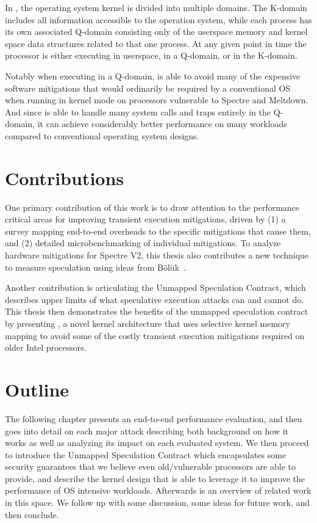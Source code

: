 In \sys, the operating system kernel is divided into multiple domains.
The K-domain includes all information accessible to the operation system, while each process has its own associated Q-domain consisting only of the userspace memory and kernel space data structures related to that one process.
At any given point in time the processor is either executing in userspace, in a Q-domain, or in the K-domain. 

Notably when executing in a Q-domain, \sys is able to avoid many of the expensive software mitigations that would ordinarily be required by a conventional OS when running in kernel mode on processors vulnerable to Spectre and Meltdown.
And since \sys is able to handle many system calls and traps entirely in the Q-domain, it can achieve considerably better performance on many workloads compared to conventional operating system designs.

\section{Contributions}

One primary contribution of this work is to draw attention to the performance critical areas for improving transient execution mitigations, driven by 
(1) a survey mapping end-to-end overheads to the specific mitigations that cause them, and 
(2) detailed microbenchmarking of individual mitigations.
To analyze hardware mitigations for Spectre V2, this thesis also contributes a new technique to measure speculation using ideas from Bölük~\cite{speculating-x86}.

Another contribution is articulating the Unmapped Speculation Contract, which describes upper limits of what speculative execution attacks can and cannot do.
This thesis then demonstrates the benefits of the unmapped speculation contract
by presenting \sys{}, a novel kernel architecture that uses
selective kernel memory mapping to avoid some of the costly transient execution
mitigations required on older Intel processors.

\section{Outline}
The following chapter presents an end-to-end performance evaluation, and then goes into detail on each major attack describing both background on how it works as well as analyzing its impact on each evaluated system.
We then proceed to introduce the Unmapped Speculation Contract which encapsulates some security guarantees that we believe even old/vulnerable processors are able to provide, and describe the \sys kernel design that is able to leverage it to improve the performance of OS intensive workloads.
Afterwards is an overview of related work in this space.
We follow up with some discussion, some ideas for future work, and then conclude.
